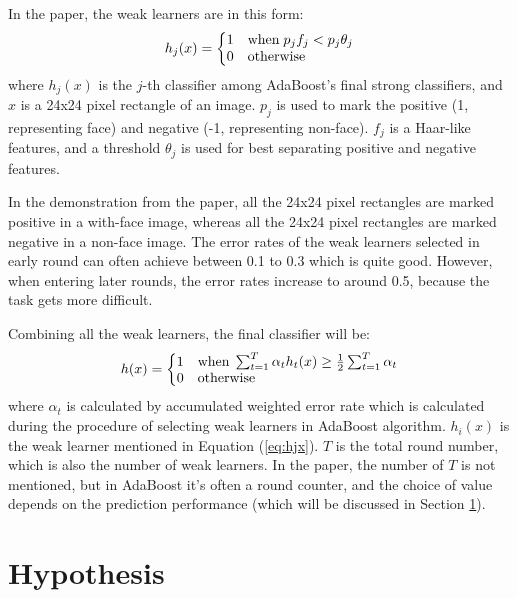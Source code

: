 \documentclass[10pt,twocolumn,letterpaper]{article}
\begin{document}
In the paper, the weak learners are in this form:
\begin{equation}
\label{eq:hjx}
h_{j}(x)=\left\{\begin{matrix*}[l]
1 & \textup{when} \; p_{j}f_{j} < p_{j}\theta _{j}\\
0 & \textup{otherwise}
\end{matrix*}\right.
\end{equation}
where $h_{j}(x)$ is the $j$-th classifier among AdaBoost's final strong classifiers, and $x$ is a 24x24 pixel rectangle of an image.
$p_{j}$ is used to mark the positive (1, representing face) and negative (-1, representing non-face).
$f_{j}$ is a Haar-like features, and a threshold $\theta _{j}$ is used for best separating positive and negative features.

In the demonstration from the paper, all the 24x24 pixel rectangles are marked positive in a with-face image,
whereas all the 24x24 pixel rectangles are marked negative in a non-face image.
The error rates of the weak learners selected in early round can often achieve between 0.1 to 0.3 which is quite good.
However, when entering later rounds, the error rates increase to around 0.5, because the task gets more difficult.

Combining all the weak learners, the final classifier will be:
$$h(x)=\left\{\begin{matrix*}[l]
1 & \textup{when} \; \sum_{t=1}^{T} \alpha _{t} h_{t}(x) \geq \frac{1}{2} \sum_{t=1}^{T} \alpha _{t}\\
0 & \textup{otherwise}
\end{matrix*}\right.$$
where $\alpha _{t}$ is calculated by accumulated weighted error rate which is calculated during the procedure of selecting weak learners in AdaBoost algorithm.
$h_{i}(x)$ is the weak learner mentioned in Equation (\ref{eq:hjx}). $T$ is the total round number, which is also the number of weak learners.
In the paper, the number of $T$ is not mentioned, but in AdaBoost it's often a round counter,
and the choice of value depends on the prediction performance (which will be discussed in Section \ref{sec:hypo}).

\section{Hypothesis} \label{sec:hypo}
\end{document}
